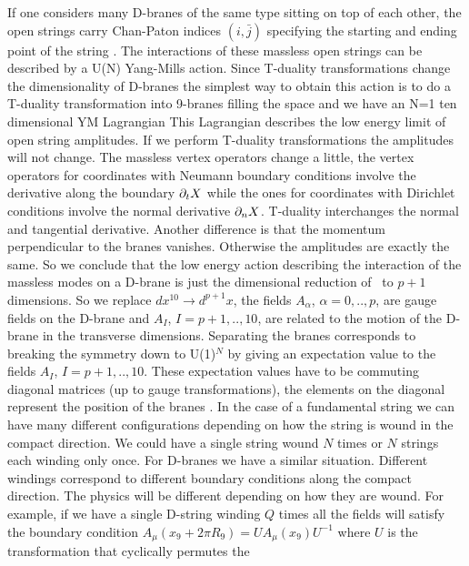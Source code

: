 If one considers many D-branes of the same
type sitting on top of each other, the
open strings  carry  Chan-Paton
indices $(i,\bar{j})$ specifying the starting and
ending point of the string \polchinskinotes \wittenbound . 
The interactions of these massless open strings 
can be described by a U(N) Yang-Mills action. 
Since T-duality transformations change the dimensionality
of D-branes
the simplest way to obtain this action  is to do a T-duality 
transformation into  9-branes filling the
space and  we have an N=1 ten dimensional YM Lagrangian
\eqn{}
This Lagrangian  describes the low energy limit
of open string amplitudes.
If we perform T-duality transformations the 
amplitudes will not change. The massless 
 vertex operators 
change a little, the vertex operators for  coordinates with
Neumann boundary conditions  involve the
derivative along the boundary $ \partial_t X $ while the ones for
coordinates with  Dirichlet conditions  
involve the normal derivative $\partial_n X $. T-duality 
interchanges the normal and tangential derivative.
Another difference is that the momentum perpendicular to the
branes vanishes. 
Otherwise the amplitudes are exactly the same. 
So we conclude that the low energy action
describing the interaction of the massless modes on
a D-brane is just the dimensional reduction of \tendym\ to $p+1$
dimensions.
So we replace $dx^{10} \rightarrow d^{p+1} x $, the 
fields $A_\alpha$, $\alpha=0,..,p$, are gauge fields
on the D-brane and $A_I$, $I=p+1,..,10$, are related to 
the motion  of the D-brane in the transverse dimensions. 
Separating the branes corresponds to breaking the symmetry 
down to U(1)$^N$ by giving an expectation value to the fields
$A_I$, $I=p+1,..,10$. These expectation values have to be
commuting diagonal matrices (up to gauge transformations), the
elements on the diagonal represent the position of the branes
\daipol \wittenbound .
In the case of a fundamental string we can have many different
configurations depending on how the string is wound in 
the compact direction. We could have a single string
wound $N$ times or $N$ strings each winding only once. 
For D-branes  we have a similar situation. Different windings
correspond to different boundary conditions along
the compact direction. 
The physics will be different 
depending on how they are wound. 
For example, if we have a single  D-string winding 
$Q$ times all the fields will satisfy the boundary 
condition $A_\mu( x_9+ 2 \pi R_9) = U A_\mu(x_9) U^{-1} $ where
$U$ is the transformation that cyclically permutes the 
